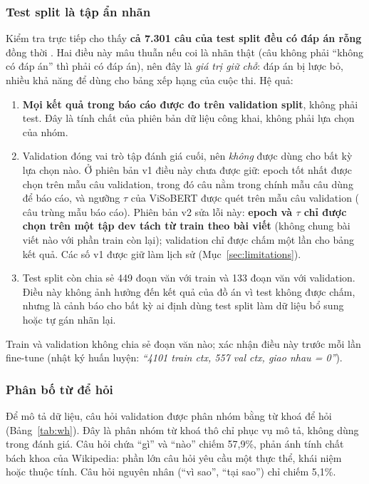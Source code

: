 \subsubsection{Test split là tập ẩn nhãn}
\label{sec:blind}

Kiểm tra trực tiếp cho thấy \textbf{cả 7.301 câu của test split đều có đáp án rỗng} đồng thời
. Hai điều này mâu thuẫn nếu coi là nhãn thật (câu không phải
``không có đáp án'' thì phải có đáp án), nên đây là \emph{giá trị giữ chỗ}: đáp án bị lược bỏ,
nhiều khả năng để dùng cho bảng xếp hạng của cuộc thi. Hệ quả:

\begin{enumerate}
  \item \textbf{Mọi kết quả trong báo cáo được đo trên validation split}, không phải test.
        Đây là tính chất của phiên bản dữ liệu công khai, không phải lựa chọn của nhóm.
  \item Validation đóng vai trò tập đánh giá cuối, nên \emph{không} được dùng cho bất kỳ lựa
        chọn nào. Ở phiên bản v1 điều này chưa được giữ: epoch tốt nhất được chọn trên mẫu
        \overlapSelN{} câu validation, trong đó \overlapSelEval{} câu nằm trong chính mẫu
        \histN{} câu dùng để báo cáo, và ngưỡng $\tau$ của ViSoBERT được quét trên mẫu
        \overlapTauN{} câu validation (\overlapTauEval{} câu trùng mẫu báo cáo). Phiên bản v2 sửa
        lỗi này: \textbf{epoch và $\tau$ chỉ được chọn trên một tập dev tách từ train theo bài
        viết} (không chung bài viết nào với phần train còn lại); validation chỉ được chấm một lần
        cho bảng kết quả. Các số v1 được giữ làm lịch sử (Mục~\ref{sec:limitations}).
  \item Test split còn chia sẻ 449 đoạn văn với train và 133 đoạn văn với validation. Điều
        này không ảnh hưởng đến kết quả của đồ án vì test không được chấm, nhưng là cảnh báo
        cho bất kỳ ai định dùng test split làm dữ liệu bổ sung hoặc tự gán nhãn lại.
\end{enumerate}

Train và validation không chia sẻ đoạn văn nào;  xác nhận điều này
trước mỗi lần fine-tune (nhật ký huấn luyện: \emph{``4101 train ctx, 557 val ctx, giao nhau = 0''}).

\subsubsection{Phân bố từ để hỏi}

Để mô tả dữ liệu, câu hỏi validation được phân nhóm bằng từ khoá để hỏi
(Bảng~\ref{tab:wh}). Đây là phân nhóm từ khoá thô chỉ phục vụ mô tả, không dùng trong đánh giá.
Câu hỏi chứa ``gì'' và ``nào'' chiếm 57,9\%, phản ánh tính chất bách khoa của Wikipedia: phần
lớn câu hỏi yêu cầu một thực thể, khái niệm hoặc thuộc tính. Câu hỏi nguyên nhân (``vì sao'',
``tại sao'') chỉ chiếm 5,1\%.

